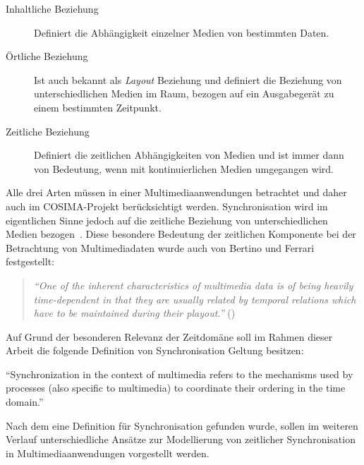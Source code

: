   \begin{description}
    \item[Inhaltliche Beziehung] Definiert die Abhängigkeit einzelner Medien von bestimmten Daten.
    \item[Örtliche Beziehung] Ist auch bekannt als \emph{Layout} Beziehung und definiert die Beziehung von unterschiedlichen Medien im Raum, bezogen auf ein Ausgabegerät zu einem bestimmten Zeitpunkt.
    \item[Zeitliche Beziehung] Definiert die zeitlichen Abhängigkeiten von Medien und ist immer dann von Bedeutung, wenn mit kontinuierlichen Medien umgegangen wird.
  \end{description}
  
  Alle drei Arten müssen in einer Multimediaanwendungen betrachtet und daher auch im COSIMA-Projekt berücksichtigt werden. Synchronisation wird im eigentlichen Sinne jedoch auf die zeitliche Beziehung von unterschiedlichen Medien bezogen~\citep[S. 572]{steinmetz1995mcc}. Diese besondere Bedeutung der zeitlichen Komponente bei der Betrachtung von Multimediadaten wurde auch von Bertino und Ferrari festgestellt:

  \begin{quote}
    \emph{"`One of the inherent characteristics of multimedia data is of being heavily time-dependent in that they are usually related by temporal relations which have to be maintained during their playout."'} (\citep[S. 612]{bertino1998tsm})
  \end{quote}
  
   Auf Grund der besonderen Relevanz der Zeitdomäne soll im Rahmen dieser Arbeit die folgende Definition von Synchronisation Geltung besitzen: 
  
  \begin{definition}[Synchronisation]\label{def:synchronisation}
    "`Synchronization in the context of multimedia refers to the mechanisms used by processes (also specific to multimedia) to coordinate their ordering in the time domain."'~\emph{\citep[S. 401]{steinmetz1990spm}}
  \end{definition}
  
  Nach dem eine Definition für Synchronisation gefunden wurde, sollen im weiteren Verlauf unterschiedliche Ansätze zur Modellierung von zeitlicher Synchronisation in Multimediaanwendungen vorgestellt werden.
  
\label{msec:modelle_zur_beschreibung_zeitlicher_synchronisation}

